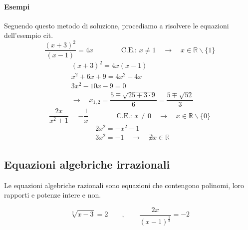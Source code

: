 \paragraph{Esempi}
Seguendo questo metodo di soluzione, procediamo a risolvere le equazioni dell'esempio {\color{red} cit}.
\begin{equation}
    \dfrac{(x + 3)^2}{(x-1)} = 4 x  \qquad \qquad \text{C.E.: } x \ne 1 \quad \rightarrow \quad x \in \mathbb{R}\backslash \{1\}
\end{equation}
\begin{equation}
    \begin{aligned}
        & (x + 3)^2 = 4x(x-1) \\
        & x^2+6x+9 = 4x^2 -4x \\
        & 3x^2-10x-9 = 0 \\
        & \rightarrow \quad x_{1,2} = \dfrac{5 \mp \sqrt{25+3\cdot9}}{6} = \dfrac{5 \mp \sqrt{52}}{3}
    \end{aligned}
\end{equation}
\begin{equation}
    \dfrac{2x}{x^2+1} = -\dfrac{1}{x} \qquad \qquad \text{C.E.: } x \ne 0 \quad \rightarrow \quad x \in \mathbb{R}\backslash \{0\}
\end{equation}
\begin{equation}
\begin{aligned}
    & 2x^2= - x^2 - 1 \\
    & 3x^2= - 1 \quad \rightarrow \quad \nexists x \in \mathbb{R}
\end{aligned}
\end{equation}

\subsection{Equazioni algebriche irrazionali}
\begin{definition} Le equazioni algebriche razionali sono equazioni che contengono polinomi, loro rapporti e potenze intere e non.
\end{definition}
\begin{example}
\begin{equation}
    \sqrt[3]{x-3} = 2 \qquad , \qquad \dfrac{2 x}{(x-1)^{\frac{1}{2}}} = - 2
\end{equation}
\end{example}
